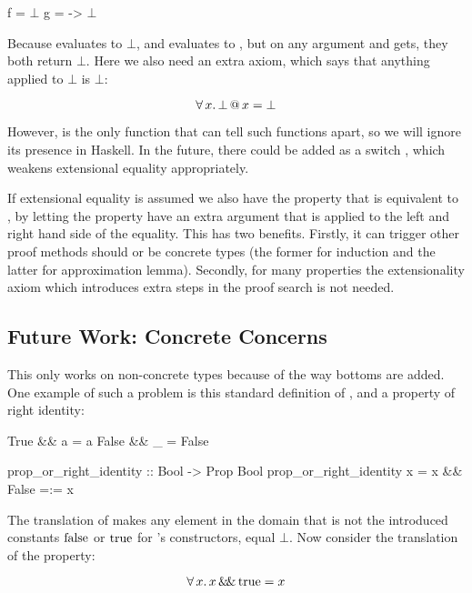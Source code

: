\begin{code}[mathescape]
f = $\bot$
g = \x -> $\bot$
\end{code}

Because  evaluates to $\bot$, and  evaluates
to \hs{()}, but on any argument  and  gets, they both
return $\bot$. Here we also need an extra axiom, which says that
anything applied to $\bot$ is $\bot$:

\begin{equation*}
\forall \, x . \, \bot \, @ \, x = \bot
\end{equation*}

However,  is the only function that can tell such functions
apart, so we will ignore its presence in Haskell.  In the future,
there could be added as a switch , which weakens
extensional equality appropriately.

If extensional equality is assumed we also have the property that
 is equivalent to , by letting the
property have an extra argument that is applied to the left and right
hand side of the equality. This has two benefits. Firstly, it can
trigger other proof methods should  or  be concrete types
(the former for induction and the latter for approximation
lemma). Secondly, for many properties the extensionality axiom which
introduces extra steps in the proof search is not needed.

\subsection{Future Work: Concrete Concerns}
\label{sec:concreteconcerns}

This only works on non-concrete types because of the way bottoms are
added. One example of such a problem is this standard definition of
\hs{\&\&}, and a property of right identity:

\begin{code}
True  && a = a
False && _ = False

prop_or_right_identity :: Bool -> Prop Bool
prop_or_right_identity x = x && False =:= x
\end{code}

The translation of \hs{\&\&} makes any element in the domain that is not
the introduced constants $\mathrm{false}$ or $\mathrm{true}$ for 's
constructors, equal $\bot$. Now consider the translation of the
property:

\begin{equation*}
\forall \, x . \, x \, \mathrm{\&\!\&} \, \mathrm{true} = x
\end{equation*}


